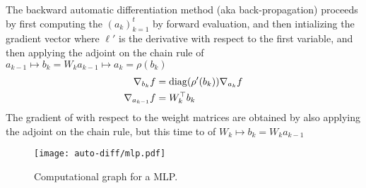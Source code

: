 The backward automatic differentiation method (aka back-propagation) proceeds by first computing the $(a_k)_{k=1}^t$ by forward evaluation, and then intializing the gradient vector
where $\ell'$ is the derivative with respect to the first variable, and then applying the adjoint on the chain rule of $a_{k-1} \mapsto b_k  = W_k a_{k-1}\mapsto a_k = \rho(b_k)$
\begin{align*}
	\nabla_{b_{k}} f &= \operatorname{diag}(\rho'(b_k)) \nabla_{a_k} f \\
	\nabla_{a_{k-1}} f &= W_k^\top b_{k}
\end{align*}
The gradient of with respect to the weight matrices are obtained by also applying the adjoint on the chain rule, but this time to of $W_k \mapsto b_k  = W_k a_{k-1}$
\fi 

\begin{figure}
\centering
\texttt{[image: auto-diff/mlp.pdf]} 
\caption{\label{fig-mlp}
Computational graph for a MLP. 
}
\end{figure}


